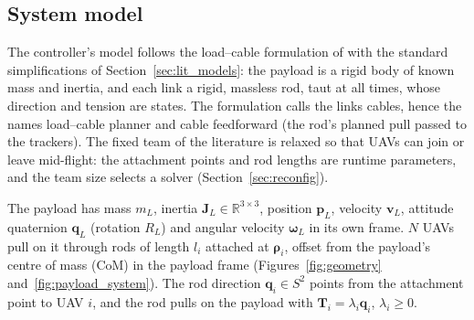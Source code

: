 
\subsection{System model}
\label{sec:model}

The controller's model follows the load--cable formulation of \cite{tudelft} with the standard
simplifications of Section~\ref{sec:lit_models}: the payload is a rigid body of known mass and inertia,
and each link a rigid, massless rod, taut at all times, whose direction and tension are states. The
formulation calls the links cables, hence the names load--cable planner and cable feedforward (the rod's
planned pull passed to the trackers). The fixed team of the literature
\cite{efficient, wahbaKinodynamicMotionPlanning2024, quan2025swarm} is relaxed so that UAVs can join or
leave mid-flight:
the attachment points and rod lengths are runtime parameters, and the team size selects a solver
(Section~\ref{sec:reconfig}).

The payload has mass $m_L$, inertia $\mathbf{J}_L \in \mathbb{R}^{3\times3}$, position $\mathbf{p}_L$,
velocity $\mathbf{v}_L$, attitude quaternion $\mathbf{q}_L$ (rotation $R_L$) and angular velocity
$\boldsymbol{\omega}_L$ in its own frame. $N$ UAVs pull on it through rods of length $l_i$ attached at
$\boldsymbol{\rho}_i$, offset from the payload's centre of mass (CoM) in the payload frame
(Figures~\ref{fig:geometry} and~\ref{fig:payload_system}). The rod direction $\mathbf{q}_i \in S^2$ points
from the attachment point to UAV $i$, and the rod pulls on the payload with
$\mathbf{T}_i = \lambda_i \mathbf{q}_i$, $\lambda_i \ge 0$.

